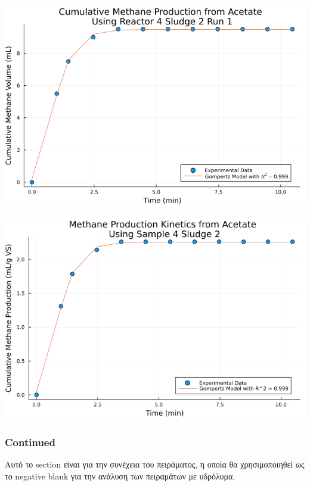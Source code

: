 \documentclass[11pt]{article}
\begin{document}
\begin{center}
\includegraphics[width=.9\linewidth]{../plots/BMPs/Acetate/methane_kinetics_acet_test_4_s2_min.png}
\end{center}

\begin{center}
\includegraphics[width=.9\linewidth]{../plots/BMPs/Acetate/specific_methane_kinetics_acet_test_4_s2.png}
\end{center}

\subsubsection{Continued}
\label{sec:org7b80932}
Αυτό το section είναι για την συνέχεια του πειράματος, η οποία θα χρησιμοποιηθεί ως το negative blank για την ανάλυση των πειραμάτων με υδρόλυμα.
\end{document}
